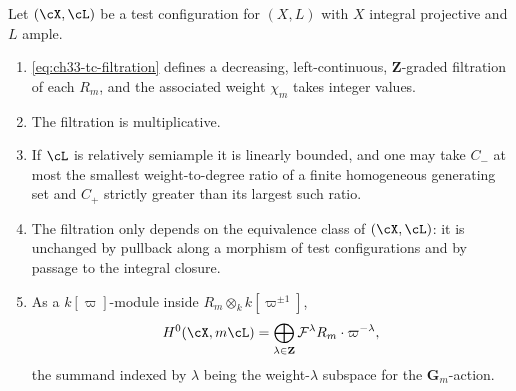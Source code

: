 \begin{theorem}
\label{thm:ch33-tc-filtration-properties}
Let $(\cX,\cL)$ be a test configuration for $(X,L)$ with $X$ integral
projective and $L$ ample.
\begin{enumerate}
\item \eqref{eq:ch33-tc-filtration} defines a decreasing, left-continuous,
 $\mathbf Z$-graded filtration of each $R_m$, and the associated weight
 $\chi_m$ takes integer values.
\item The filtration is multiplicative.
\item If $\cL$ is relatively semiample it is linearly bounded, and one may
 take $C_-$ at most the smallest weight-to-degree ratio of a finite
 homogeneous generating set and $C_+$ strictly greater than its largest
 such ratio.
\item The filtration only depends on the equivalence class of
 $(\cX,\cL)$: it is unchanged by pullback along a morphism of test
 configurations and by passage to the integral closure.
\item As a $k[\varpi]$-module inside $R_m\otimes_kk[\varpi^{\pm1}]$,
\begin{equation}
\label{eq:ch33-h0-weight-decomposition}
 H^0(\cX,m\cL)
 =\bigoplus_{\lambda\in\mathbf Z}
    \mathcal F^\lambda R_m\cdot\varpi^{-\lambda},
\end{equation}
 the summand indexed by $\lambda$ being the weight-$\lambda$ subspace
 for the $\mathbf G_m$-action.
\end{enumerate}
\end{theorem}

